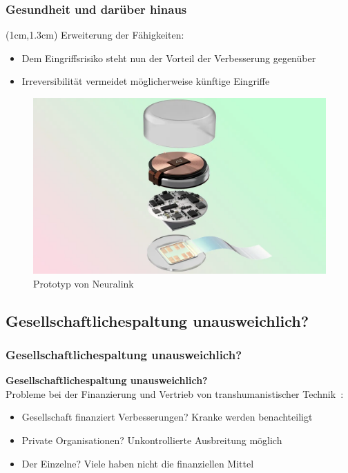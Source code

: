 \documentclass[aspectratio=169,16pt,xcolor=table]{beamer}
\begin{document}
\begin{frame}
  \frametitle{Gesundheit und darüber hinaus}
  \begin{textblock*}{15cm}(1cm,1.3cm)
    Erweiterung der Fähigkeiten:
    \begin{itemize}
        \item Dem Eingriffsrisiko steht nun der Vorteil der Verbesserung gegenüber
        \item Irreversibilität vermeidet möglicherweise künftige Eingriffe
    \end{itemize}
  \end{textblock*}
  \begin{figure}[h]
    \includegraphics[scale=0.3]{"pictures/neuralink"}
    \caption{Prototyp von Neuralink~\cite{neuralink}}
    \label{Neuralink}
  \end{figure}
\end{frame}

\subsection*{Gesellschaftlichespaltung unausweichlich?}
\begin{frame}
  \frametitle{Gesellschaftlichespaltung unausweichlich?}
  \small \textbf{Gesellschaftlichespaltung unausweichlich?}\\
  \small Probleme bei der Finanzierung und Vertrieb von transhumanistischer Technik~\cite{khan_aziz_2019}:
  \begin{itemize}
    \item Gesellschaft finanziert Verbesserungen? Kranke werden benachteiligt
    \item Private Organisationen? Unkontrollierte Ausbreitung möglich
    \item Der Einzelne? Viele haben nicht die finanziellen Mittel
  \end{itemize}
  \end{frame}
\end{document}

